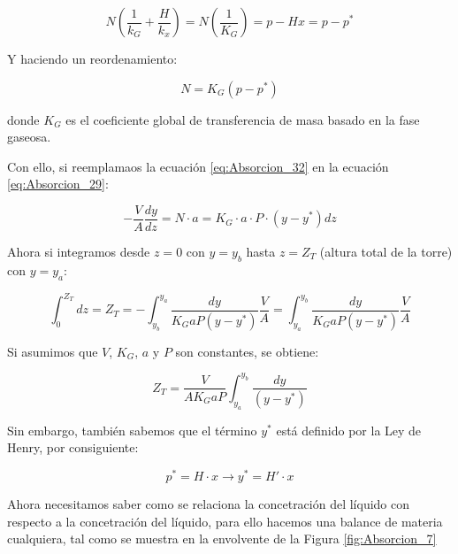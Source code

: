 \documentclass[11pt]{book}
\begin{document}
\begin{equation}
    \label{eq:Absorcion_31}
    N \left( \frac{1}{k_G} + \frac{H}{k_x} \right) = N \left( \frac{1}{K_G} \right) = p - Hx = p - p^* 
\end{equation}

Y haciendo un reordenamiento:

\begin{equation}
    \label{eq:Absorcion_32}
    N = K_G (p-p^*)
\end{equation}

donde $K_G$ es el coeficiente global de transferencia de masa basado en la fase gaseosa.

Con ello, si reemplamaos la ecuación \ref{eq:Absorcion_32} en la ecuación \ref{eq:Absorcion_29}: 

\begin{equation}
    \label{eq:Absorcion_33}
    -\frac{V}{A} \frac{dy}{dz} = N \cdot a = K_G \cdot a \cdot  P \cdot (y-y^*) dz
\end{equation}

Ahora si integramos desde $z = 0$ con $y = y_b$ hasta $z = Z_T$ (altura total de la torre) con $y = y_a$:

\begin{equation}
    \label{eq:Absorcion_34}
    \int_{0}^{Z_T} dz = Z_T = -\int_{y_b}^{y_a} \frac{dy}{K_G a P (y-y^*)} \frac{V}{A} = \int_{y_a}^{y_b} \frac{dy}{K_G a P (y-y^*)} \frac{V}{A}
\end{equation}

Si asumimos que $V$, $K_G$, $a$ y $P$ son constantes, se obtiene:

\begin{equation}
    \label{eq:Absorcion_35}
    Z_T = \frac{V}{A K_G a P}\int_{y_a}^{y_b} \frac{dy}{(y-y^*)}
\end{equation}

Sin embargo, también sabemos que el término $y^*$ está definido por la Ley de Henry, por consiguiente:

\begin{equation*}
    p^* = H \cdot x  \longrightarrow y^* = H' \cdot x
\end{equation*}

Ahora necesitamos saber como se relaciona la concetración del líquido con respecto a la concetración del líquido, para ello hacemos una balance de materia cualquiera, tal como se muestra en la envolvente de la Figura \ref{fig:Absorcion_7}
\end{document}
